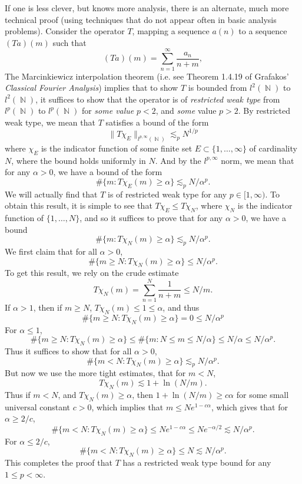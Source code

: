 \documentclass[answers]{exam}
\DeclareMathOperator{\NN}{\mathbb{N}}
\begin{document}
\begin{questions}
\begin{solution}
	If one is less clever, but knows more analysis, there is an alternate, much more technical proof (using techniques that do not appear often in basic analysis problems). Consider the operator $T$, mapping a sequence $a(n)$ to a sequence $(Ta)(m)$ such that
	\[ (Ta)(m) = \sum_{n = 1}^\infty \frac{a_n}{n+m}, \]
	The Marcinkiewicz interpolation theorem (i.e. see Theorem 1.4.19 of  Grafakos' \emph{Classical Fourier Analysis}) implies that to show $T$ is bounded from $l^2(\NN)$ to $l^2(\NN)$, it suffices to show that the operator is of \emph{restricted weak type} from $l^p(\NN)$ to $l^p(\NN)$ for \emph{some value} $p < 2$, and \emph{some} value $p > 2$. By restricted weak type, we mean that $T$ satisfies a bound of the form
	\[ \| T \chi_E \|_{l^{p,\infty}(\NN)} \lesssim_p N^{1/p} \]
	where $\chi_E$ is the indicator function of some finite set $E \subset \{ 1,\dots, \infty \}$ of cardinality $N$, where the bound holds uniformly in $N$. And by the $l^{p,\infty}$ norm, we mean that for any $\alpha > 0$, we have a bound of the form
	\[ \# \{ m : T \chi_E (m) \geq \alpha \} \lesssim_p N / \alpha^p. \]
	We will actually find that $T$ is of restricted weak type for any $p \in [1,\infty)$. To obtain this result, it is simple to see that $T\chi_E \leq T\chi_N$, where $\chi_N$ is the indicator function of $\{ 1, \dots, N \}$, and so it suffices to prove that for any $\alpha > 0$, we have a bound
	\[ \# \{ m : T \chi_N(m) \geq \alpha \} \lesssim_p N / \alpha^p. \]
	We first claim that for all $\alpha > 0$,
	\[ \# \{ m \geq N : T \chi_N(m) \geq \alpha \} \leq N / \alpha^p. \]
	To get this result, we rely on the crude estimate
	\[ T \chi_N(m) = \sum_{n = 1}^N \frac{1}{n + m} \leq N/m. \]
	If $\alpha > 1$, then if $m \geq N$, $T \chi_N(m) \leq 1 \leq \alpha$, and thus
	\[ \# \{ m \geq N : T \chi_N(m) \geq \alpha \} = 0 \leq N / \alpha^p \]
	For $\alpha \leq 1$,
	\[ \# \{ m \geq N: T \chi_N(m) \geq \alpha \} \leq \# \{ m : N \leq m \leq N/\alpha \} \leq N / \alpha \leq N / \alpha^p. \]
	Thus it suffices to show that for all $\alpha > 0$,
	\[ \# \{ m < N : T \chi_N(m) \geq \alpha \} \lesssim_p N / \alpha^p. \]
	But now we use the more tight estimates, that for $m < N$,
	\[ T \chi_N(m) \lesssim 1 + \ln(N/m). \]
	Thus if $m < N$, and $T \chi_N(m) \geq \alpha$, then $1 + \ln(N/m) \geq c \alpha$ for some small universal constant $c > 0$, which implies that $m \leq N e^{1 - c \alpha}$, which gives that for $\alpha \geq 2/c$,
	\[ \# \{ m < N : T\chi_N(m) \geq \alpha \} \leq N e^{1 - c \alpha} \leq N e^{- \alpha / 2} \lesssim N / \alpha^p. \]
	For $\alpha \leq 2/c$,
	\[ \# \{ m < N : T\chi_N(m) \geq \alpha \} \leq N \lesssim N / \alpha^p. \]
	This completes the proof that $T$ has a restricted weak type bound for any $1 \leq p < \infty$.
\end{solution}






\end{questions}
\end{document}
